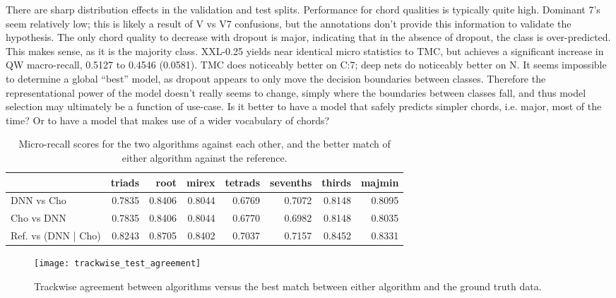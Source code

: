 There are sharp distribution effects in the validation and test splits. Performance for chord qualities is typically quite high.
Dominant 7's seem relatively low; this is likely a result of V vs V7 confusions, but the annotations don't provide this information to validate the hypothesis.
The only chord quality to decrease with dropout is major, indicating that in the absence of dropout, the class is over-predicted. This makes sense, as it is the majority class.
XXL-0.25 yields near identical micro statistics to TMC, but achieves a significant increase in QW macro-recall, 0.5127 to 0.4546 (0.0581).
TMC does noticeably better on C:7; deep nets do noticeably better on N.
It seems impossible to determine a global ``best'' model, as dropout appears to only move the decision boundaries between classes.
Therefore the representational power of the model doesn't really seems to change, simply where the boundaries between classes fall, and thus model selection may ultimately be a function of use-case.
Is it better to have a model that safely predicts simpler chords, i.e. major, most of the time? Or to have a model that makes use of a wider vocabulary of chords?


\begin{table}[h]
\begin{center}
\scriptsize
\caption{Micro-recall scores for the two algorithms against each other, and the better match of either algorithm against the reference.}
\label{tab:qwise_macro_recall}

\begin{tabular}{lrrrrrrr}
\hline
         &   triads &   root &   mirex &   tetrads &   sevenths &   thirds &   majmin \\
\hline
 DNN vs Cho &   0.7835 & 0.8406 &  0.8044 &    0.6769 &     0.7072 &   0.8148 &   0.8095 \\
 Cho vs DNN &   0.7835 & 0.8406 &  0.8044 &    0.6770 &     0.6982 &   0.8148 &   0.8035 \\
 \hline
 Ref. vs (DNN | Cho) &   0.8243 & 0.8705  &  0.8402  &   0.7037   &   0.7157  &  0.8452  &  0.8331 \\
\hline
\end{tabular}
\end{center}
\end{table}


\begin{figure}[t]
\centering
\texttt{[image: trackwise\_test\_agreement]}
\caption{Trackwise agreement between algorithms versus the best match between either algorithm and the ground truth data.}
\label{fig:trackwise_test_agreement}
\end{figure}


